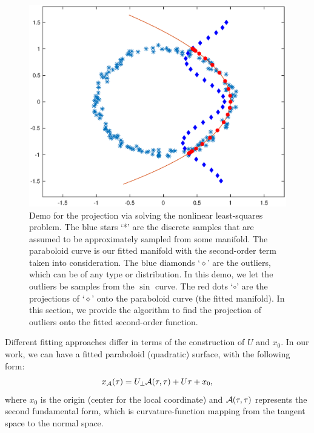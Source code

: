 \documentclass{article}
\theoremstyle{remark}
\begin{document}
\begin{figure}[h] %
   \centering
   \includegraphics[width=0.8\linewidth]{demo3.eps} 
   \vspace{-0.4cm}
   \caption{Demo for the projection via solving the nonlinear least-squares problem. The blue stars `*' are the discrete samples that are assumed to be approximately sampled from some manifold. The paraboloid curve is our fitted manifold with the second-order term taken into consideration. The blue diamonds `$\diamond$' are the outliers, which can be of any type or distribution. In this demo, we let the outliers be samples from the $\sin$ curve. The red dots `$\circ$' are the projections of `$\diamond$' onto the paraboloid curve (the fitted manifold). In this section, we provide the algorithm to find the projection of outliers onto the fitted second-order function.}
   \label{fig:demo}
\end{figure}



Different fitting approaches differ in terms of the construction of $U$ and $x_0$.
In our work, we can have a fitted paraboloid (quadratic) surface, with the following form:
\begin{equation}\label{manifold_representation}
x_{\cal A}(\tau) = U_{\perp} {\cal A} (\tau,\tau) + U \tau +x_0,
\end{equation}
where $x_0$ is the origin (center for the local coordinate) and ${\cal A} (\tau,\tau)$ represents the second fundamental form, which is curvature-function mapping from the tangent space to the normal space. 
\end{document}
